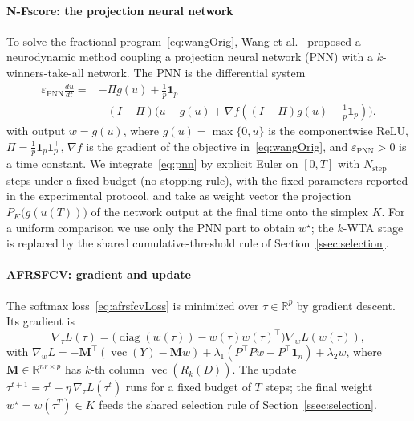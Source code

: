 \documentclass[]{interact}
\theoremstyle{plain}
\theoremstyle{definition}
\theoremstyle{remark}
\newcommand{\R}{\mathbb{R}}
\DeclareMathOperator{\diag}{diag}
\DeclareMathOperator{\vecop}{vec}
\begin{document}
\paragraph*{N-Fscore: the projection neural network}
To solve the fractional program~\eqref{eq:wangOrig}, Wang et al.~\citep{wang2021fractional} proposed a neurodynamic method coupling a projection neural network (PNN) with a $k$-winners-take-all network. The PNN is the differential system
\begin{equation}\label{eq:pnn}
\begin{split}\varepsilon_{\mathrm{PNN}}\frac{du}{dt}={}&-\Pi g(u)+\tfrac1p\mathbf{1}_p\\&-(I-\Pi)\bigl(u-g(u)+\nabla f((I-\Pi)g(u)+\tfrac1p\mathbf{1}_p)\bigr).\end{split}
\end{equation}
with output $w=g(u)$, where $g(u)=\max\{0,u\}$ is the componentwise ReLU, $\Pi=\tfrac1p\mathbf{1}_p\mathbf{1}_p^{\top}$, $\nabla f$ is the gradient of the objective in~\eqref{eq:wangOrig}, and $\varepsilon_{\mathrm{PNN}}>0$ is a time constant. We integrate~\eqref{eq:pnn} by explicit Euler on $[0,T]$ with $N_{\mathrm{step}}$ steps under a fixed budget (no stopping rule), with the fixed parameters reported in the experimental protocol, and take as weight vector the projection $P_K\bigl(g(u(T))\bigr)$ of the network output at the final time onto the simplex $K$. For a uniform comparison we use only the PNN part to obtain $w^\star$; the $k$-WTA stage is replaced by the shared cumulative-threshold rule of Section~\ref{ssec:selection}.

\paragraph*{AFRSFCV: gradient and update}
The softmax loss~\eqref{eq:afrsfcvLoss} is minimized over $\tau\in\R^p$ by gradient descent. Its gradient is
\begin{equation}\label{eq:gradTau}
\nabla_\tau L(\tau)=\bigl(\diag(w(\tau))-w(\tau)w(\tau)^{\top}\bigr)\nabla_w L(w(\tau)),
\end{equation}
with $\nabla_w L=-\mathbf{M}^{\top}(\vecop(Y)-\mathbf{M}w)+\lambda_1(P^{\top}Pw-P^{\top}\mathbf{1}_n)+\lambda_2 w$, where $\mathbf{M}\in\R^{nr\times p}$ has $k$-th column $\vecop(\underline{R_k}(D))$. The update $\tau^{t+1}=\tau^t-\eta\,\nabla_\tau L(\tau^t)$ runs for a fixed budget of $T$ steps; the final weight $w^\star=w(\tau^T)\in K$ feeds the shared selection rule of Section~\ref{ssec:selection}.
\end{document}
